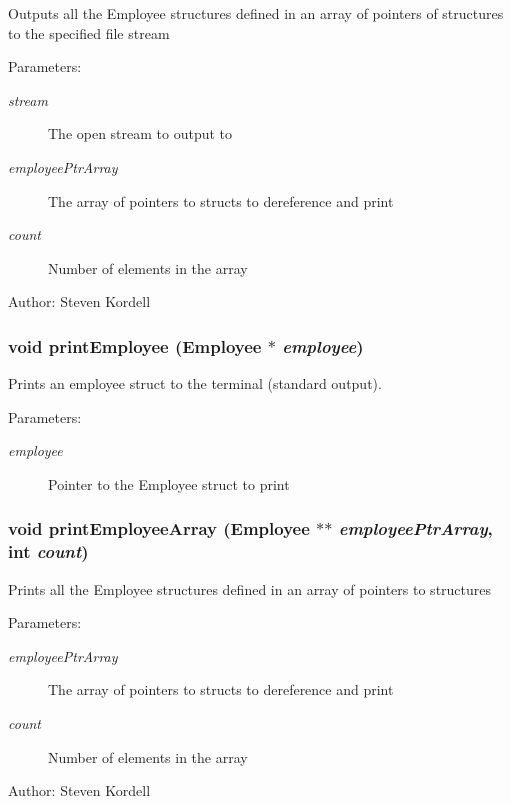 Outputs all the Employee structures defined in an array of pointers of structures to the specified file stream \begin{Desc}
\item[Parameters:]
\begin{description}
\item[{\em stream}]The open stream to output to \item[{\em employee\-Ptr\-Array}]The array of pointers to structs to dereference and print \item[{\em count}]Number of elements in the array \end{description}
\end{Desc}
\begin{Desc}
\item[Author:]Steven Kordell \end{Desc}
\subsubsection{\setlength{\rightskip}{0pt plus 5cm}void print\-Employee (\bf{Employee} $\ast$ {\em employee})}\label{employeef_8h_291560c311b426d2ea7f359bfc45ed5f}


Prints an employee struct to the terminal (standard output). \begin{Desc}
\item[Parameters:]
\begin{description}
\item[{\em employee}]Pointer to the Employee struct to print \end{description}
\end{Desc}
\subsubsection{\setlength{\rightskip}{0pt plus 5cm}void print\-Employee\-Array (\bf{Employee} $\ast$$\ast$ {\em employee\-Ptr\-Array}, int {\em count})}\label{employeef_8h_3caa62038d3de5aaf99f615cd4c5b6e7}


Prints all the Employee structures defined in an array of pointers to structures \begin{Desc}
\item[Parameters:]
\begin{description}
\item[{\em employee\-Ptr\-Array}]The array of pointers to structs to dereference and print \item[{\em count}]Number of elements in the array \end{description}
\end{Desc}
\begin{Desc}
\item[Author:]Steven Kordell \end{Desc}
